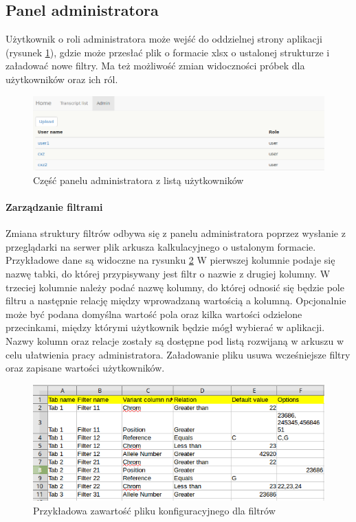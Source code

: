 \documentclass[a4paper,12pt,twoside]{article}
\begin{document}
\newpage
\subsection{Panel administratora}
Użytkownik o roli administratora może wejść do oddzielnej strony aplikacji (rysunek \ref{fig:adminpic}), gdzie może przesłać plik o formacie xlsx o ustalonej strukturze
i załadować nowe filtry. Ma też możliwość zmian widoczności próbek dla użytkowników oraz ich ról.

\begin{figure}[h]
  \centering
  \includegraphics[width=\textwidth]{obrazy/aplikacja/admin.png}
  \caption{Część panelu administratora z listą użytkowników}
  \label{fig:adminpic}
\end{figure}

\paragraph{Zarządzanie filtrami}

Zmiana struktury filtrów odbywa się z panelu administratora poprzez wysłanie
z przeglądarki na serwer plik arkusza kalkulacyjnego o ustalonym formacie. Przykładowe dane są widoczne na rysunku \ref{fig:input_filepic} W pierwszej kolumnie podaje się nazwę tabki, do której przypisywany
jest filtr o nazwie z drugiej kolumny. W trzeciej kolumnie należy podać nazwę kolumny, do której
odnosić się będzie pole filtru a następnie relację między wprowadzaną wartością a kolumną.
Opcjonalnie może być podana domyślna wartość pola oraz kilka wartości odzielone przecinkami, między którymi użytkownik będzie mógł wybierać w aplikacji. Nazwy kolumn oraz relacje zostały są dostępne pod
listą rozwijaną w arkuszu w celu ułatwienia pracy administratora. 
Załadowanie pliku usuwa wcześniejsze filtry oraz zapisane wartości użytkowników. 
 
\begin{figure}[h!]
  \centering
  \includegraphics[width=\textwidth]{obrazy/aplikacja/input_file.png}
  \caption{Przykładowa zawartość pliku konfiguracyjnego dla filtrów}
  \label{fig:input_filepic}
\end{figure}
\end{document}
